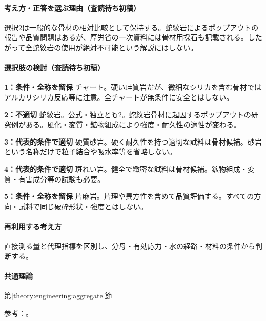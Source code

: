 \paragraph{考え方・正答を選ぶ理由（査読待ち初稿）} 選択2は一般的な骨材の相対比較として保持する。蛇紋岩によるポップアウトの報告や品質問題はあるが、厚労省の一次資料には骨材用採石も記載される。したがって全蛇紋岩の使用が絶対不可能という解説にはしない。

\paragraph{選択肢の検討（査読待ち初稿）}\mbox{}\par

\noindent\textbf{1：条件・全称を留保} チャート。硬い珪質岩だが、微細なシリカを含む骨材ではアルカリシリカ反応等に注意。全チャートが無条件に安全とはしない。\par

\noindent\textbf{2：不適切} 蛇紋岩。公式・独立とも2。蛇紋岩骨材に起因するポップアウトの研究例がある。風化・変質・鉱物組成により強度・耐久性の適性が変わる。\par

\noindent\textbf{3：代表的条件で適切} 硬質砂岩。硬く耐久性を持つ適切な試料は骨材候補。砂岩という名称だけで粒子結合や吸水率等を省略しない。\par

\noindent\textbf{4：代表的条件で適切} 斑れい岩。健全で緻密な試料は骨材候補。鉱物組成・変質・有害成分等の試験も必要。\par

\noindent\textbf{5：条件・全称を留保} 片麻岩。片理や異方性を含めて品質評価する。すべての方向・試料で同じ破砕形状・強度とはしない。\par

\paragraph{再利用する考え方} 直接測る量と代理指標を区別し、分母・有効応力・水の経路・材料の条件から判断する。

\paragraph{共通理論} \hyperref[theory:engineering:aggregate]{第\ref*{theory:engineering:aggregate}節}

\par 参考：\cite{eng52_serpent_aggregate,eng52_popout}。

